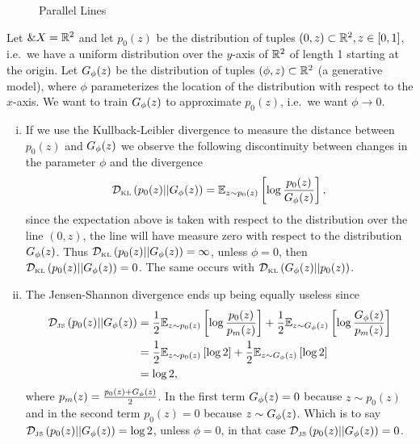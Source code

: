 \begin{example}
  \begin{figure}[h] \centering
    \caption{Parallel Lines}%
    \label{fig:parallel-lines}
  \end{figure}%
  \label{example:learning-parallel-lines}

  Let $\&X = \mathbb{R}^2$ and let $p_0(z)$ be the distribution of tuples
  $(0, z) \subset \mathbb{R}^2, z \in [0, 1]$, i.e.\ we have a uniform
  distribution over the $y$-axis of $\mathbb{R}^2$ of length 1 starting at the
  origin. Let $G_\phi(z)$ be the distribution of tuples
  $(\phi, z) \subset \mathbb{R}^2$ (a generative model), where $\phi$
  parameterizes the location of the distribution with respect to the
  $x$-axis. We want to train $G_\phi(z)$ to approximate $p_0(z)$, i.e.\ we
  want $\phi \to 0$.
  \begin{enumerate}[(i)]
  \item If we use the Kullback-Leibler divergence to measure the
    distance between $p_0(z)$ and $G_\phi(z)$ we observe the following
    discontinuity between changes in the parameter $\phi$ and the
    divergence
    \begin{align}
      \mathcal{D}_{\text{\tiny KL}}\left( p_0(z) \middle| \middle| G_\phi(z) \right) = \mathbb{E}_{z \sim p_0(z)}\left[ \log{p_0(z)\over G_\phi(z)} \right],
    \end{align}
    since the expectation above is taken with respect to the
    distribution over the line $(0, z)$, the line will have measure
    zero with respect to the distribution $G_\phi(z)$. Thus
    $\mathcal{D}_{\text{\tiny KL}}\left( p_0(z) \middle| \middle| G_\phi(z) \right) = \infty$, unless $\phi = 0$, then
    $\mathcal{D}_{\text{\tiny KL}}\left( p_0(z) \middle| \middle| G_\phi(z) \right) = 0$. The same occurs with
    $\mathcal{D}_{\text{\tiny KL}}\left( G_\phi(z) \middle| \middle| p_0(z) \right)$.
  \item The Jensen-Shannon divergence ends up being equally useless
    since
    \begin{align}
      \mathcal{D}_{\text{\tiny JS}}\left(p_0(z)\middle|\middle|G_\phi(z)\right) & = {1 \over 2} \mathbb{E}_{z \sim p_0(z)}\left[ \log{p_0(z)
                            \over p_m(z)} \right] + {1 \over 2} \mathbb{E}_{z \sim
                            G_\phi(z)}\left[ \log{G_\phi(z) \over p_m(z)} \right] \\
                          & = {1 \over 2} \mathbb{E}_{z \sim p_0(z)}\left[ \log{2} \right] + {1
                            \over 2} \mathbb{E}_{z \sim G_\phi(z)}\left[ \log{2} \right] \\
                          & = \log{2},
    \end{align}
    where $p_m(z) = {p_0(z) + G_\phi(z) \over 2}$. In the first term
    $G_\phi(z) = 0$ because $z \sim p_0(z)$ and in the second term
    $p_0(z) = 0$ because $z \sim G_\phi(z)$. Which is to say
    $\mathcal{D}_{\text{\tiny JS}}\left(p_0(z)\middle|\middle|G_\phi(z)\right) = \log{2}$, unless $\phi = 0$, in that case
    $\mathcal{D}_{\text{\tiny JS}}\left(p_0(z)\middle|\middle|G_\phi(z)\right) = 0$.
  \end{enumerate}
\end{example}


